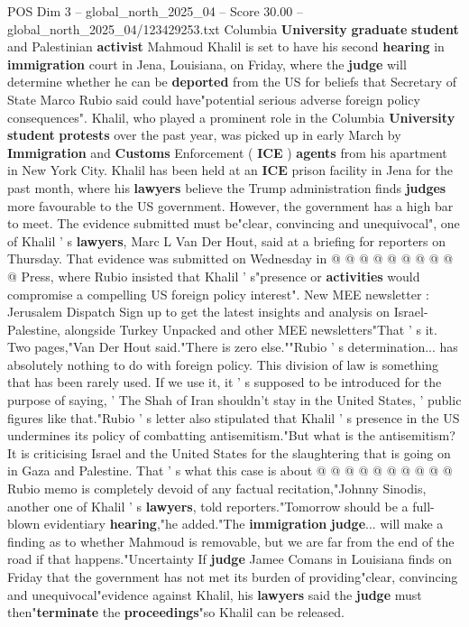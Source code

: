 \begin{textsample}{POS Dim 3 – global\_north\_2025\_04 – Score 30.00 – global\_north\_2025\_04/123429253.txt}  \label{ex:f3_pos_043}
Columbia \textbf{University} \textbf{graduate} \textbf{student} and Palestinian \textbf{activist} Mahmoud Khalil is set to have his second \textbf{hearing} in \textbf{immigration} court in Jena, Louisiana, on Friday, where the \textbf{judge} will determine whether he can be \textbf{deported} from the US for beliefs that Secretary of State Marco Rubio said could have"potential serious adverse foreign policy consequences".
Khalil, who played a prominent role in the Columbia \textbf{University} \textbf{student} \textbf{protests} over the past year, was picked up in early March by \textbf{Immigration} and \textbf{Customs} Enforcement ( \textbf{ICE} ) \textbf{agents} from his apartment in New York City.
Khalil has been held at an \textbf{ICE} prison facility in Jena for the past month, where his \textbf{lawyers} believe the Trump administration finds \textbf{judges} more favourable to the US government.
However, the government has a high bar to meet.
The evidence submitted must be"clear, convincing and unequivocal", one of Khalil ' s \textbf{lawyers}, Marc L Van Der Hout, said at a briefing for reporters on Thursday.
That evidence was submitted on Wednesday in @ @ @ @ @ @ @ @ @ @ Press, where Rubio insisted that Khalil ' s"presence or \textbf{activities} would compromise a compelling US foreign policy interest".
New MEE newsletter : Jerusalem Dispatch Sign up to get the latest insights and analysis on Israel-Palestine, alongside Turkey Unpacked and other MEE newsletters"That ' s it.
Two pages,"Van Der Hout said."There is zero else.""Rubio ' s determination... has absolutely nothing to do with foreign policy.
This division of law is something that has been rarely used.
If we use it, it ' s supposed to be introduced for the purpose of saying, ' The Shah of Iran shouldn't stay in the United States, ' public figures like that."Rubio ' s letter also stipulated that Khalil ' s presence in the US undermines its policy of combatting antisemitism."But what is the antisemitism?
It is criticising Israel and the United States for the slaughtering that is going on in Gaza and Palestine.
That ' s what this case is about @ @ @ @ @ @ @ @ @ @ Rubio memo is completely devoid of any factual recitation,"Johnny Sinodis, another one of Khalil ' s \textbf{lawyers}, told reporters."Tomorrow should be a full-blown evidentiary \textbf{hearing},"he added."The \textbf{immigration} \textbf{judge}... will make a finding as to whether Mahmoud is removable, but we are far from the end of the road if that happens."Uncertainty If \textbf{judge} Jamee Comans in Louisiana finds on Friday that the government has not met its burden of providing"clear, convincing and unequivocal"evidence against Khalil, his \textbf{lawyers} said the \textbf{judge} must then"\textbf{terminate} the \textbf{proceedings}"so Khalil can be released.

\end{textsample}
